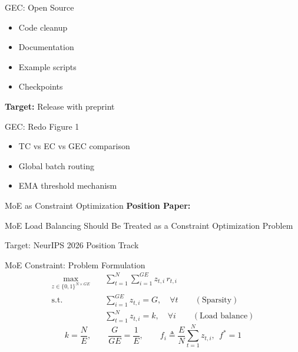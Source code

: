 \documentclass{beamer}
\begin{document}
\begin{frame}{GEC: Open Source}
\begin{itemize}
    \item[$\square$] Code cleanup
    \item[$\square$] Documentation
    \item[$\square$] Example scripts
    \item[$\square$] Checkpoints
\end{itemize}

\vspace{0.3cm}
\textbf{Target:} Release with preprint
\end{frame}

\begin{frame}{GEC: Redo Figure 1}
\begin{itemize}
    \item TC vs EC vs GEC comparison
    \item Global batch routing
    \item EMA threshold mechanism
\end{itemize}
\end{frame}

\begin{frame}{MoE as Constraint Optimization}
\centering
\vspace{1cm}
{\Large \textbf{Position Paper:}}

\vspace{0.5cm}
{\large MoE Load Balancing Should Be Treated as a Constraint Optimization Problem}

\vspace{1cm}
Target: NeurIPS 2026 Position Track
\end{frame}

\begin{frame}{MoE Constraint: Problem Formulation}
\begin{align*}
\max_{z \in \{0,1\}^{N \times GE}} \quad & \sum_{t=1}^N \sum_{i=1}^{GE} z_{t,i}\, r_{t,i} \\
\text{s.t.} \quad
& \sum_{i=1}^{GE} z_{t,i} = G, \quad \forall t \qquad (\text{Sparsity}) \\
& \sum_{t=1}^{N} z_{t,i} = k, \quad \forall i \qquad (\text{Load balance})
\end{align*}
\[
k = \frac{N}{E},
\qquad
\frac{G}{GE} = \frac{1}{E},
\qquad
f_i \triangleq \frac{E}{N}\sum_{t=1}^N z_{t,i},\ \ f^*=1
\]
\end{frame}
\end{document}
